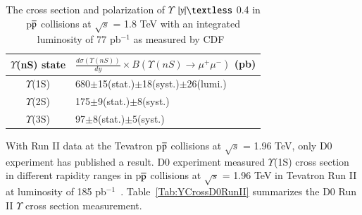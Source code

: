 

\begin{table}
  \begin{center}
    \caption[]{ The cross section and polarization of $\Upsilon$
$|y|\textless$ 0.4 in p$\overline{\rm p}$ collisions at $\surd s$ = 1.8 TeV with
an integrated luminosity of 77 pb$^{-1}$ as measured by CDF~\cite{CDF:2001fdy}}
\label{Tab:YCrossCDF02}
\begin{tabular}{cl} 
\hline 
\hline
$\Upsilon$(nS) state             &$\frac{d\sigma(\Upsilon(nS))}{dy}\times B(\Upsilon(nS)\rightarrow\mu^{+}\mu^{-})$ (pb)    \\              
\hline
$\Upsilon$(1S)                   &680$\pm$15(stat.)$\pm$18(syst.)$\pm$26(lumi.)\\
$\Upsilon$(2S)                   &175$\pm$9(stat.)$\pm$8(syst.)\\
$\Upsilon$(3S)                   &97$\pm$8(stat.)$\pm$5(syst.)\\   
\hline
\hline
\end{tabular}
\end{center}
\end{table}

With Run II data at the Tevatron p$\overline{\rm p}$ collisions at $\surd s$ = 1.96 TeV,
only D0 experiment has published a result.
D0 experiment measured $\Upsilon$(1S) cross section in different 
rapidity ranges in p$\overline{\rm p}$ collisions at $\surd s$  = 1.96 TeV in
Tevatron Run II at luminosity of 185 pb$^{-1}$~\cite{D0:2005klj}.
Table~\ref{Tab:YCrossD0RunII} summarizes the D0 Run II $\Upsilon$ cross section
measurement.


